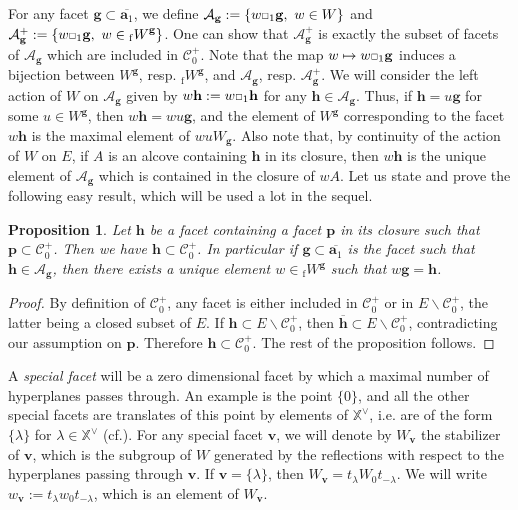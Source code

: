 \documentclass[11pt]{amsart}
\theoremstyle{plain}
\newtheorem{prop}[thm]{Proposition}
\theoremstyle{remark}
\newcommand{\car}{\mbox{\relsize{-5}$\Box$}}
\numberwithin{equation}{section}
\begin{document}
	For any facet $\mathbf{g}\subset \overline{\mathbf{a}_1}$, we define $\mathcal{A}_\mathbf{g}:=\{w\car_1\mathbf{g},~w\in W\}$ and  $\mathcal{A}_\mathbf{g}^{+}:=\{w\car_1\mathbf{g},~w\in {_\mathrm{f}W}^\mathbf{g}\}$. One can show that $\mathcal{A}_\mathbf{g}^{+}$ is exactly the subset of facets of $\mathcal{A}_\mathbf{g}$ which are included in $\mathscr{C}^+_0$. Note that the map $w \mapsto w\car_1\mathbf{g}$ induces a bijection between $W^\mathbf{g}$, resp. ${_\mathrm{f}W}^\mathbf{g}$, and $\mathcal{A}_\mathbf{g}$, resp. $\mathcal{A}_\mathbf{g}^{+}$. We will consider the left action of $W$ on $\mathcal{A}_\mathbf{g}$ given by $w\mathbf{h}:=w\car_1\mathbf{h}$ for any $\mathbf{h}\in\mathcal{A}_\mathbf{g}$. Thus, if $\mathbf{h}=u\mathbf{g}$ for some $u\in W^\mathbf{g}$, then $w\mathbf{h}=wu\mathbf{g}$, and the element of $W^\mathbf{g}$ corresponding to the facet $w\mathbf{h}$ is the maximal element of $wuW_\mathbf{g}$. Also note that, by continuity of the action of $W$ on $E$, if $A$ is an alcove containing $\mathbf{h}$ in its closure, then $w\mathbf{h}$ is the unique element of $\mathcal{A}_\mathbf{g}$ which is contained in the closure of $wA$. Let us state and prove the following easy result, which will be used a lot in the sequel.
	\begin{prop}\label{dominant facet}
		Let $\mathbf{h}$ be a facet containing a facet $\mathbf{p}$ in its closure such that $\mathbf{p}\subset \mathscr{C}^+_0$. Then we have $\mathbf{h}\subset \mathscr{C}^+_0$. In particular if $\mathbf{g}\subset\overline{\mathbf{a}_1}$ is the facet such that $\mathbf{h}\in\mathcal{A}_\mathbf{g}$, then there exists a unique element $w\in{_\mathrm{f}W}^\mathbf{g}$ such that $w\mathbf{g}=\mathbf{h}$.
	\end{prop}
	\begin{proof}
	By definition of $\mathscr{C}^+_0$, any facet is either included in $\mathscr{C}^+_0$ or in $E\backslash\mathscr{C}^+_0$, the latter being a closed subset of $E$. If $\mathbf{h}\subset E\backslash\mathscr{C}^+_0$, then $\overline{\mathbf{h}}\subset E\backslash\mathscr{C}^+_0$, contradicting our assumption on $\mathbf{p}$. Therefore $\mathbf{h}\subset \mathscr{C}^+_0$. The rest of the proposition follows.
	\end{proof}
	A \textit{special facet} will be a zero dimensional facet by which a maximal number of hyperplanes passes through. An example is the point $\{0\}$, and all the other special facets are translates of this point by elements of $\mathbb{X}^\vee$, i.e. are of the form $\{\lambda\}$ for $\lambda\in\mathbb{X}^\vee$ (cf.\cite[chap. VI, §2, Proposition 3]{cdi_springer_books_10_1007_978_3_540_34491_9}). For any special facet $\mathbf{v}$, we will denote by $W_\mathbf{v}$ the stabilizer of $\mathbf{v}$, which is the subgroup of $W$ generated by the reflections with respect to the hyperplanes passing through $\mathbf{v}$. If $\mathbf{v}=\{\lambda\}$, then $W_\mathbf{v}=t_\lambda W_0 t_{-\lambda}$. We will write $w_\mathbf{v}:=t_\lambda w_0t_{-\lambda}$, which is an element of $W_\mathbf{v}$.
\end{document}

